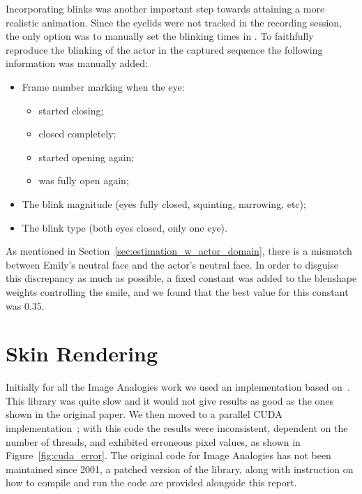 Incorporating blinks was another important step towards attaining a more realistic animation.
Since the eyelids were not tracked in the recording session, the only option was to manually set the blinking times in \Maya.
To faithfully reproduce the blinking of the actor in the captured sequence the following information was manually added:
\begin{itemize}
\item Frame number marking when the eye:
	\begin{itemize}
	\item started closing;
	\item closed completely;
	\item started opening again;
	\item was fully open again;
	\end{itemize}
\item The blink magnitude (eyes fully closed, squinting, narrowing, etc);
\item The blink type (both eyes closed, only one eye).
\end{itemize}

As mentioned in Section~\ref{sec:estimation_w_actor_domain}, there is a mismatch between Emily's neutral face and the actor's neutral face.
In order to disguise this discrepancy as much as possible, a fixed constant was added to the blenshape weights controlling the smile, and we found that the best value for this constant was $0.35$.


\section{Skin Rendering}

Initially for all the Image Analogies work we used an implementation based on~\cite{ImAnSingleThreadWeb}.
This library was quite slow and it would not give results as good as the ones shown in the original paper.
We then moved to a parallel CUDA implementation~\cite{ImAnCudaWeb}; with this code the results were inconsistent, dependent on the number of threads, and exhibited erroneous pixel values, as shown in Figure~\ref{fig:cuda_error}.
The original code for Image Analogies has not been maintained since 2001, a patched version of the library, along with instruction on how to compile and run the code are provided alongside this report.

